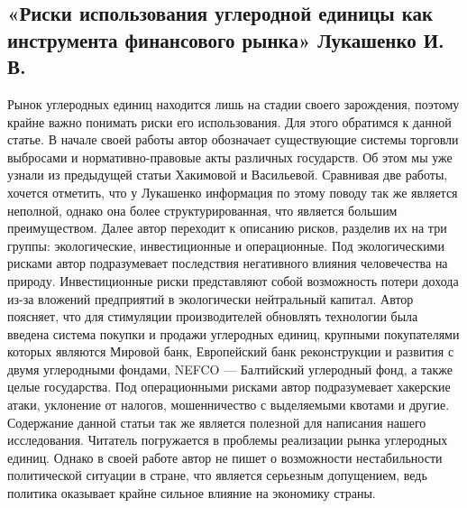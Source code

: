 \documentclass[a4paper,14pt]{article}
\begin{document}
    \subsection{«Риски использования углеродной единицы как инструмента финансового рынка» Лукашенко И. В.}
    Рынок углеродных единиц находится лишь на стадии своего зарождения, поэтому крайне важно понимать риски его использования. Для этого обратимся к данной статье. В начале своей работы автор обозначает существующие системы торговли выбросами и нормативно-правовые акты различных государств. Об этом мы уже узнали из предыдущей статьи Хакимовой и Васильевой. Сравнивая две работы, хочется отметить, что у Лукашенко информация по этому поводу так же является неполной, однако она более структурированная, что является большим преимуществом. Далее автор переходит к описанию рисков, разделив их на три группы: экологические, инвестиционные и операционные. Под экологическими рисками автор подразумевает последствия негативного влияния человечества на природу. Инвестиционные риски представляют собой возможность потери дохода из-за вложений предприятий в экологически нейтральный капитал. Автор поясняет, что для стимуляции производителей обновлять технологии была введена система покупки и продажи углеродных единиц, крупными покупателями которых являются Мировой банк, Европейский банк реконструкции и развития с двумя углеродными фондами, NEFCO — Балтийский углеродный фонд, а также целые государства. Под операционными рисками автор подразумевает хакерские атаки, уклонение от налогов, мошенничество с выделяемыми квотами и другие. Содержание данной статьи так же является полезной для написания нашего исследования. Читатель погружается в проблемы реализации рынка углеродных единиц. Однако в своей работе автор не пишет о возможности нестабильности политической ситуации в стране, что является серьезным допущением, ведь политика оказывает крайне сильное влияние на экономику страны.
\end{document}
